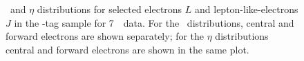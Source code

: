 \begin{figure}[h]
{        }
    \caption[\pt\ and $\eta$ distributions for selected electrons $L$ and
    lepton-like-electrons $J$ in the \Z-tag sample for 7~\tev\ data.]
    {\pt\ and $\eta$ distributions for selected electrons $L$ and
    lepton-like-electrons $J$ in the \Z-tag sample for 7~\tev\ data. 
    For the \pt\ distributions, central and forward electrons are shown
    separately; for the $\eta$ distributions central and forward electrons are
    shown in the same plot.}
\label{fig:ljdist-el-seven} 
\end{figure}

